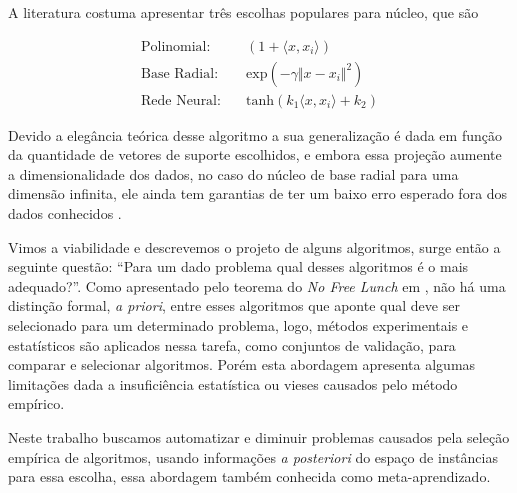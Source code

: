 A literatura costuma apresentar três escolhas populares para núcleo, que são

\begin{equation}
    \begin{split}
        \text{Polinomial:} &\quad (1+\langle x,x_i\rangle)\\
        \text{Base Radial:} &\quad \text{exp}(-\gamma \Vert x - x_i\Vert^2)\\
        \text{Rede Neural:} &\quad \text{tanh}(k_1\langle x,x_i\rangle+k_2)
    \end{split}
\end{equation}

Devido a elegância teórica desse algoritmo a sua generalização é dada em função
da quantidade de vetores de suporte escolhidos, e embora essa projeção aumente
a dimensionalidade dos dados, no caso do núcleo de base radial para uma
dimensão infinita, ele ainda tem garantias de ter um baixo erro esperado fora dos dados
conhecidos \cite{vapnik2013nature}.

Vimos a viabilidade e descrevemos o projeto de alguns algoritmos, surge então a
seguinte questão: ``Para um dado problema qual desses
algoritmos é o mais adequado?''. Como apresentado pelo teorema do \textit{No
Free Lunch} em \cite{wolpert1997no,wolpert1996lack}, não há uma distinção
formal, \textit{a priori}, entre esses algoritmos que aponte qual deve ser selecionado para um determinado problema, logo, métodos experimentais e estatísticos são
aplicados nessa tarefa, como conjuntos de validação, para comparar e selecionar
algoritmos. Porém esta abordagem apresenta algumas limitações dada a
insuficiência estatística ou vieses causados pelo método empírico.

Neste trabalho buscamos automatizar e diminuir problemas causados pela seleção
empírica de algoritmos, usando informações \textit{a posteriori} do espaço de
instâncias para essa escolha, essa abordagem também conhecida como
meta-aprendizado.

